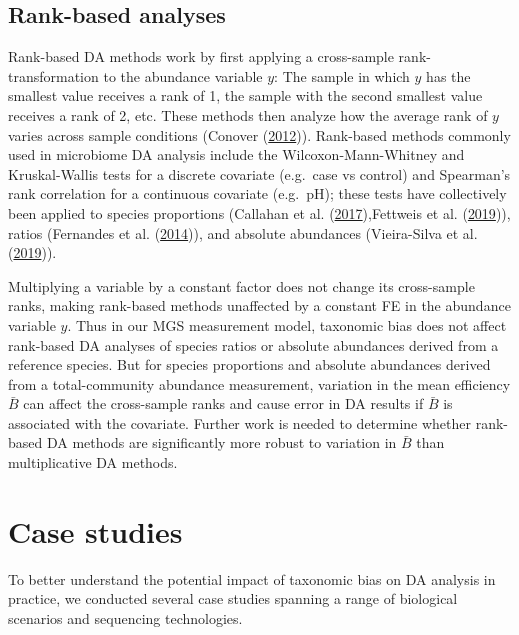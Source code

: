 \documentclass[
]{article}
\begin{document}
\hypertarget{rank-based-analyses}{%
\subsection{Rank-based analyses}\label{rank-based-analyses}}

Rank-based DA methods work by first applying a cross-sample rank-transformation to the abundance variable \(y\): The sample in which \(y\) has the smallest value receives a rank of 1, the sample with the second smallest value receives a rank of 2, etc.
These methods then analyze how the average rank of \(y\) varies across sample conditions (Conover (\protect\hyperlink{ref-conover2012ther}{2012})).
Rank-based methods commonly used in microbiome DA analysis include the Wilcoxon-Mann-Whitney and Kruskal-Wallis tests for a discrete covariate (e.g.~case vs control) and Spearman's rank correlation for a continuous covariate (e.g.~pH); these tests have collectively been applied to species proportions (Callahan et al. (\protect\hyperlink{ref-callahan2017repl}{2017}),Fettweis et al. (\protect\hyperlink{ref-fettweis2019thev}{2019})), ratios (Fernandes et al. (\protect\hyperlink{ref-fernandes2014unif}{2014})), and absolute abundances (Vieira-Silva et al. (\protect\hyperlink{ref-vieirasilva2019quan}{2019})).

Multiplying a variable by a constant factor does not change its cross-sample ranks, making rank-based methods unaffected by a constant FE in the abundance variable \(y\).
Thus in our MGS measurement model, taxonomic bias does not affect rank-based DA analyses of species ratios or absolute abundances derived from a reference species.
But for species proportions and absolute abundances derived from a total-community abundance measurement, variation in the mean efficiency \(\bar B\) can affect the cross-sample ranks and cause error in DA results if \(\bar B\) is associated with the covariate.
Further work is needed to determine whether rank-based DA methods are significantly more robust to variation in \(\bar B\) than multiplicative DA methods.

\hypertarget{case-studies}{%
\section{Case studies ~}\label{case-studies}}

To better understand the potential impact of taxonomic bias on DA analysis in practice, we conducted several case studies spanning a range of biological scenarios and sequencing technologies.
\end{document}
